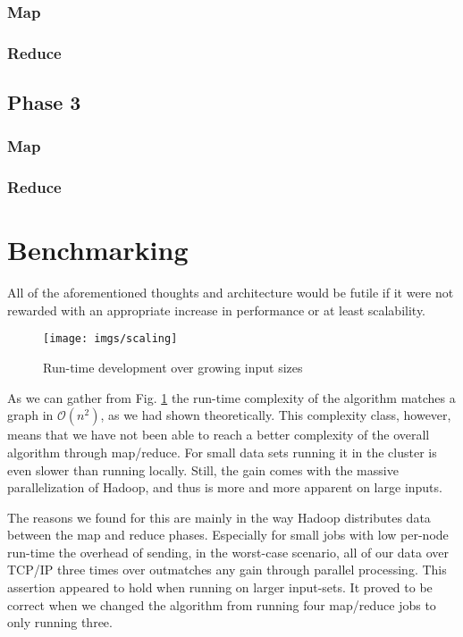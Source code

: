 \documentclass{llncs}
\begin{document}
\subsubsection{Map}
\subsubsection{Reduce}
\subsection{Phase 3}
\subsubsection{Map}
\subsubsection{Reduce} %
\section{Benchmarking}
All of the aforementioned thoughts and architecture would be futile if it were not 
rewarded with an appropriate increase in performance or at least scalability. 
\begin{figure}[tb]
  \begin{center}
    \texttt{[image: imgs/scaling]}
  \end{center}
  \caption{Run-time development over growing input sizes}
  \label{fig:runtime}
\end{figure}
As we can gather from Fig. \ref{fig:runtime} the run-time complexity of the 
algorithm matches a graph in $\mathcal{O}(n^2)$, as we had shown theoretically.
This complexity class, however, means that we have not been able to reach a 
better complexity of the overall algorithm through map/reduce. For small data sets
running it in the cluster is even slower than running locally. Still, the 
gain comes with the massive parallelization of Hadoop, and thus is more and more 
apparent on large inputs.

The reasons we found for this are mainly in the way Hadoop distributes data 
between the map and reduce phases. Especially for small jobs with low per-node 
run-time the overhead of sending, in the worst-case scenario, all of our data 
over TCP/IP three times over outmatches any gain through 
parallel processing. This assertion appeared to hold when running on larger 
input-sets. It proved to be correct when we changed the algorithm from running 
four map/reduce jobs to only running three.
\end{document}
